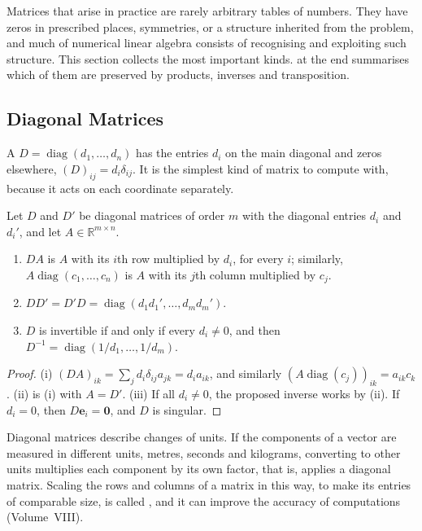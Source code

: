 Matrices that arise in practice are rarely arbitrary tables of numbers. They have zeros in prescribed places, symmetries, or a structure inherited from the problem, and much of numerical linear algebra consists of recognising and exploiting such structure. This section collects the most important kinds.  at the end summarises which of them are preserved by products, inverses and transposition.

\subsection{Diagonal Matrices}

A  $D=\operatorname{diag}(d_1,\ldots,d_n)$ has the entries $d_i$ on the main diagonal and zeros elsewhere, $(D)_{ij}=d_i\delta_{ij}$. It is the simplest kind of matrix to compute with, because it acts on each coordinate separately.

\begin{proposition}
\label{prop:diagonal}
Let $D$ and $D'$ be diagonal matrices of order $m$ with the diagonal entries $d_i$ and $d_i'$, and let $A\in\mathbb R^{m\times n}$.
\begin{enumerate}
\item $DA$ is $A$ with its $i$th row multiplied by $d_i$, for every $i$; similarly, $A\operatorname{diag}(c_1,\ldots,c_n)$ is $A$ with its $j$th column multiplied by $c_j$.
\item $DD'=D'D=\operatorname{diag}(d_1d_1',\ldots,d_md_m')$.
\item $D$ is invertible if and only if every $d_i\ne0$, and then $D^{-1}=\operatorname{diag}(1/d_1,\ldots,1/d_m)$.
\end{enumerate}
\end{proposition}

\begin{proof}
(i) $(DA)_{ik}=\sum_jd_i\delta_{ij}a_{jk}=d_ia_{ik}$, and similarly $(A\operatorname{diag}(c_j))_{ik}=a_{ik}c_k$. (ii) is (i) with $A=D'$. (iii) If all $d_i\ne0$, the proposed inverse works by (ii). If $d_i=0$, then $D\mathbf e_i=\mathbf 0$, and $D$ is singular.
\end{proof}

Diagonal matrices describe changes of units. If the components of a vector are measured in different units, metres, seconds and kilograms, converting to other units multiplies each component by its own factor, that is, applies a diagonal matrix. Scaling the rows and columns of a matrix in this way, to make its entries of comparable size, is called , and it can improve the accuracy of computations (Volume~VIII).

